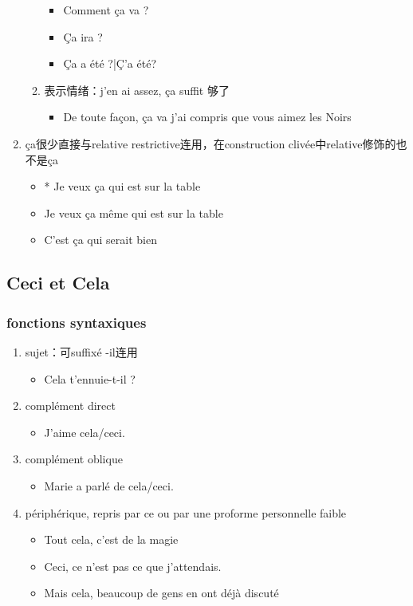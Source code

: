 \documentclass[UTF8]{report}
\begin{document}
\begin{enumerate}
\begin{enumerate}
\begin{itemize}
            \item Comment ça va ?
            \item Ça ira ?
            \item Ça a été ?|Ç’a été?
        \end{itemize}
        \item 表示情绪：j’en ai assez, ça suffit 够了
        \begin{itemize}
            \item De toute façon, ça va j’ai compris que vous aimez les Noirs
        \end{itemize}
    \end{enumerate}
    \item ça很少直接与relative restrictive连用，在construction clivée中relative修饰的也不是ça
    \begin{itemize}
        \item * Je veux ça qui est sur la table
        \item Je veux ça même qui est sur la table
        \item C’est ça qui serait bien
    \end{itemize}
\end{enumerate}


\subsection{Ceci et Cela}
\subsubsection{fonctions syntaxiques}
\begin{enumerate}
    \item sujet：可suffixé -il连用
    \begin{itemize}
        \item Cela t’ennuie-t-il ?
    \end{itemize}
    \item complément direct
    \begin{itemize}
        \item J’aime cela/ceci.
    \end{itemize}
    \item complément oblique
    \begin{itemize}
        \item Marie a parlé de cela/ceci.
    \end{itemize}
    \item périphérique, repris par ce ou par une proforme personnelle faible
    \begin{itemize}
        \item Tout cela, c’est de la magie 
        \item Ceci, ce n’est pas ce que j’attendais.
        \item Mais cela, beaucoup de gens en ont déjà discuté
    \end{itemize}
\end{enumerate}
\end{document}
